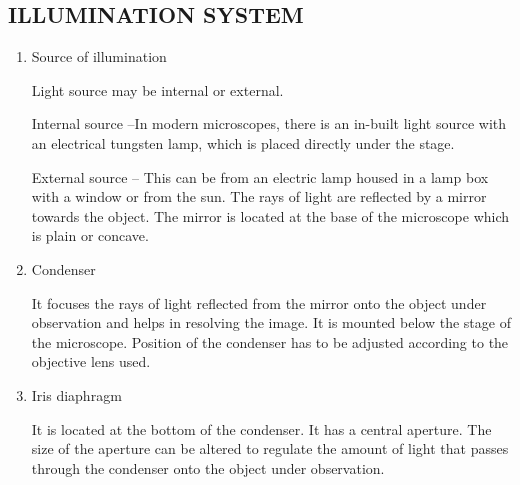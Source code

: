 \documentclass{book}
\begin{document}
		\subsection{ILLUMINATION SYSTEM}
		\begin{enumerate}

		\item{Source of illumination \newline
			\par Light source may be internal or external.
				\par Internal source –In modern microscopes, there is an in-built light source with an electrical tungsten lamp, which is placed directly under the stage.
				\par External source – This can be from an electric lamp housed in a lamp box with a window or from the sun. The rays of light are reflected by a mirror towards the object. The mirror is located at the base of the microscope which is plain or concave.}
				\item{Condenser
					\par It focuses the rays of light reflected from the mirror onto the object under observation and helps in resolving the image. It is mounted below the stage of the microscope. Position of the condenser has to be adjusted according to the objective lens used.}
					\item{Iris diaphragm
						\par It is located at the bottom of the condenser. It has a central aperture. The size of the aperture can be altered to regulate the amount of light that passes through the condenser onto the object under observation.}
						\end{enumerate}
\end{document}

